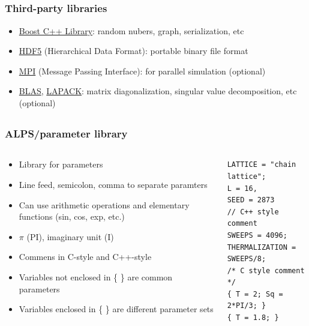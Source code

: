 \subsection*{\redm\whitem\greenb}
\begin{frame}[t,fragile]
  \frametitle{Third-party libraries}
  \begin{itemize}
    \setlength{\itemsep}{1em}
  \item \href{http://www.boost.org/}{Boost C++ Library}: random nubers, graph, serialization, etc
  \item \href{http://www.hdfgroup.org/HDF5/}{HDF5} (Hierarchical Data Format): portable binary file format
  \item \href{http://www.mpi-forum.org/}{MPI} (Message Passing Interface): for parallel simulation (optional)
  \item \href{http://www.netlib.org/blas/}{BLAS}, \href{http://www.netlib.org/lapack/}{LAPACK}: matrix diagonalization, singular value decomposition, etc (optional)
  \end{itemize}
\end{frame}

\subsection*{\redm\whitem\greenb}
\begin{frame}[t,fragile]
  \frametitle{ALPS/parameter library}
  \begin{columns}[T]
    \begin{column}{.5\textwidth}
      \begin{itemize}
      \item Library for parameters
        \item Line feed, semicolon, comma to separate paramters
        \item Can use arithmetic operations and elementary functions (sin, cos, exp, etc.)
        \item $\pi$ (PI), imaginary unit (I)
          \item Commens in C-style and C++-style
          \item Variables not enclosed in \{ \} are common parameters
          \item Variables enclosed in \{ \} are different parameter sets
      \end{itemize}
    \end{column}
    \begin{column}{.5\textwidth}
    \begin{lstlisting}
LATTICE = "chain lattice";
L = 16,
SEED = 2873
// C++ style comment
SWEEPS = 4096;
THERMALIZATION = SWEEPS/8;
/* C style comment */
{ T = 2; Sq = 2*PI/3; }
{ T = 1.8; }
\end{lstlisting}
    \end{column}
  \end{columns}
\end{frame}

